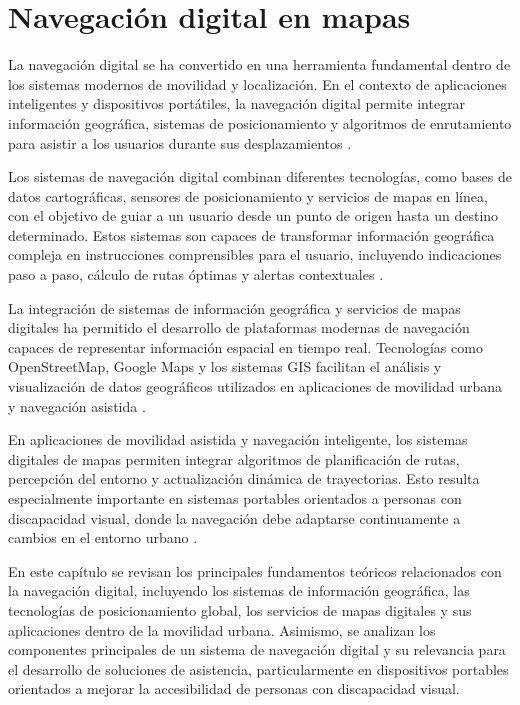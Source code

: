 \section{Navegación digital en mapas}

La navegación digital se ha convertido en una herramienta fundamental dentro de los sistemas modernos de movilidad y localización. En el contexto de aplicaciones inteligentes y dispositivos portátiles, la navegación digital permite integrar información geográfica, sistemas de posicionamiento y algoritmos de enrutamiento para asistir a los usuarios durante sus desplazamientos \cite{elhashash2022_mobilemapping}.

Los sistemas de navegación digital combinan diferentes tecnologías, como bases de datos cartográficas, sensores de posicionamiento y servicios de mapas en línea, con el objetivo de guiar a un usuario desde un punto de origen hasta un destino determinado. Estos sistemas son capaces de transformar información geográfica compleja en instrucciones comprensibles para el usuario, incluyendo indicaciones paso a paso, cálculo de rutas óptimas y alertas contextuales \cite{navigation_systems_book}.

La integración de sistemas de información geográfica y servicios de mapas digitales ha permitido el desarrollo de plataformas modernas de navegación capaces de representar información espacial en tiempo real. Tecnologías como OpenStreetMap, Google Maps y los sistemas GIS facilitan el análisis y visualización de datos geográficos utilizados en aplicaciones de movilidad urbana y navegación asistida \cite{haklay2008osm}.

En aplicaciones de movilidad asistida y navegación inteligente, los sistemas digitales de mapas permiten integrar algoritmos de planificación de rutas, percepción del entorno y actualización dinámica de trayectorias. Esto resulta especialmente importante en sistemas portables orientados a personas con discapacidad visual, donde la navegación debe adaptarse continuamente a cambios en el entorno urbano \cite{shan2017_googlemap}.

En este capítulo se revisan los principales fundamentos teóricos relacionados con la navegación digital, incluyendo los sistemas de información geográfica, las tecnologías de posicionamiento global, los servicios de mapas digitales y sus aplicaciones dentro de la movilidad urbana. Asimismo, se analizan los componentes principales de un sistema de navegación digital y su relevancia para el desarrollo de soluciones de asistencia, particularmente en dispositivos portables orientados a mejorar la accesibilidad de personas con discapacidad visual.


